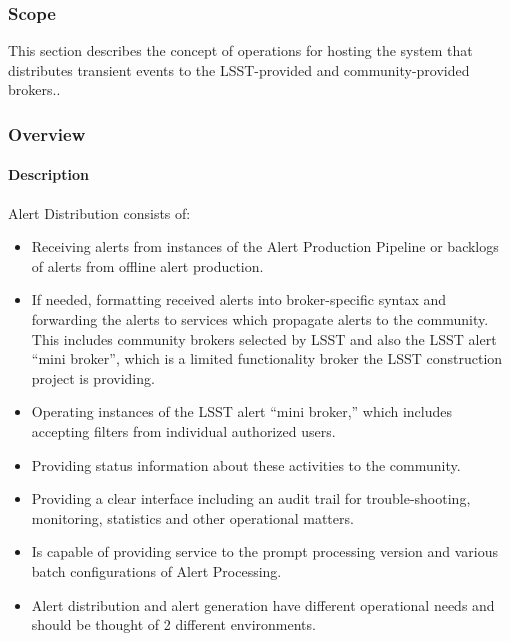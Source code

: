 \subsubsection{Scope}
This section describes the concept of operations for hosting the system that distributes transient events to the LSST-provided and community-provided brokers..

\subsubsection{Overview}

\paragraph{Description}

Alert Distribution consists of:
\begin{itemize}

\item Receiving alerts from instances of the Alert Production Pipeline or backlogs of alerts from offline alert production.

\item If needed, formatting received alerts into broker-specific syntax and forwarding the alerts to services which propagate alerts to the community. This includes  community brokers selected by LSST and also  the LSST alert “mini broker”, which is a limited functionality broker the LSST construction project is providing.

\item Operating instances of the LSST alert “mini broker,” which includes accepting filters from individual authorized users.

\item Providing status information about these activities to the community.

\item Providing a clear interface including an audit trail for trouble-shooting, monitoring, statistics and other operational matters.

\item Is capable of providing service to the prompt processing version and various batch configurations of Alert Processing.
\item Alert distribution and alert generation have different operational needs and should be thought of 2 different environments.

\end{itemize}

